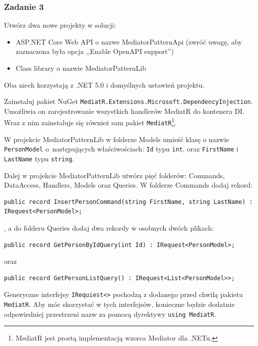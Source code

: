 

\subsubsection{Zadanie 3}
Utwórz dwa nowe projekty w solucji:
\begin{itemize}
	\item ASP.NET Core Web API o nazwe MediatorPatternApi (zwróć uwagę, aby zaznaczona była opcja ,,Enable OpenAPI support'')
	\item Class library o nazwie MediatorPatternLib
\end{itemize}
Oba niech korzystają z .NET 5.0 i domyślnych ustawień projektu.

Zainstaluj pakiet NuGet \texttt{MediatR.Extensions.Microsoft.DependencyInjection}. Umożliwia on zarejestrowanie wszystkich handlerów MediatR do kontenera DI. Wraz z nim zainstaluje się również sam pakiet \texttt{MediatR}\footnote{MediatR jest prostą implementacją wzorca Mediator dla .NETu.}.

W projekcie MediatorPatternLib w folderze Models umieść klasę o nazwie \texttt{PersonModel} o~następujących właściwościach: \texttt{Id} typu \texttt{int}, oraz \texttt{FirstName} i \texttt{LastName} typu \texttt{string}.

Dalej w projekcie MediatorPatternLib utwórz pięć folderów: Commands, DataAccess, Handlers, Models oraz Queries. W folderze Commands dodaj rekord:
\begin{lstlisting}
public record InsertPersonCommand(string FirstName, string LastName) : IRequest<PersonModel>;
\end{lstlisting}
, a do folderu Queries dodaj dwa rekordy w osobnych dwóch plikach:
\begin{lstlisting}
public record GetPersonByIdQuery(int Id) : IRequest<PersonModel>;
\end{lstlisting}
oraz
\begin{lstlisting}
public record GetPersonListQuery() : IRequest<List<PersonModel>>;
\end{lstlisting}
Generyczne interfejsy \texttt{IRequiest<>} pochodzą z dodanego przed chwilą pakietu \texttt{MediatR}. Aby móc skorzystać w tych interfejsów, konieczne będzie dodatnie odpowiedniej przestrzeni nazw za pomocą dyrektywy \texttt{using MediatR}.

